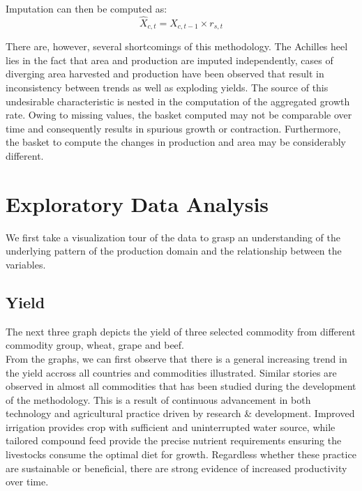 \documentclass[nojss]{jss}\usepackage[]{graphicx}\usepackage[]{color}
\begin{document}
Imputation can then be computed as:
\begin{equation}
  \hat{X}_{c, t} = X_{c, t-1} \times r_{s, t}
\end{equation}
  

There are, however, several shortcomings of this methodology. The
Achilles heel lies in the fact that area and production are imputed
independently, cases of diverging area harvested and production have
been observed that result in inconsistency between trends as well as
exploding yields. The source of this undesirable characteristic is
nested in the computation of the aggregated growth rate. Owing to
missing values, the basket computed may not be comparable over time
and consequently results in spurious growth or
contraction. Furthermore, the basket to compute the changes in
production and area may be considerably different.\\


\section{Exploratory Data Analysis}

We first take a visualization tour of the data to grasp an
understanding of the underlying pattern of the production domain and
the relationship between the variables.

\subsection{Yield}

The next three graph depicts the yield of three selected commodity
from different commodity group, wheat, grape and beef.\\


From the graphs, we can first observe that there is a general
increasing trend in the yield accross all countries and commodities
illustrated. Similar stories are observed in almost all commodities
that has been studied during the development of the methodology. This
is a result of continuous advancement in both technology and
agricultural practice driven by research \& development. Improved
irrigation provides crop with sufficient and uninterrupted water
source, while tailored compound feed provide the precise nutrient
requirements ensuring the livestocks consume the optimal diet for
growth. Regardless whether these practice are sustainable or
beneficial, there are strong evidence of increased productivity over
time.\\
\end{document}

